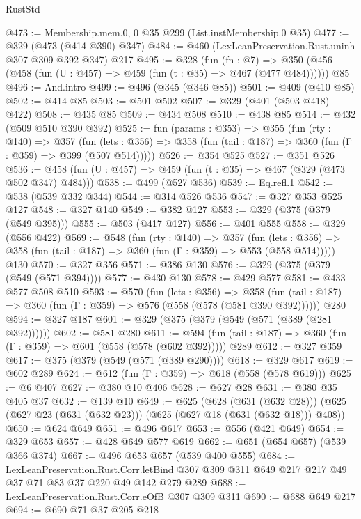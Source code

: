 \begin{lexlean}{RustStd}
\begin{coremodule}
@473 := Membership.mem.{0, 0} @35 @299 (List.instMembership.{0} @35)
@477 := @329 (@473 (@414 @390) @347)
@484 := @460 (LexLeanPreservation.Rust.uninh @307 @309 @392 @347) @217
@495 := @328
    (fun (fn : @7) =>
    @350 (@456 (@458 (fun (U : @457) => @459 (fun (t : @35) => @467 (@477 @484))))))
    @85
@496 := And.intro
@499 := @496 (@345 (@346 @85))
@501 := @409 (@410 @85)
@502 := @414 @85
@503 := @501 @502
@507 := @329 (@401 (@503 @418) @422)
@508 := @435 @85
@509 := @434 @508
@510 := @438 @85
@514 := @432 (@509 @510 @390 @392)
@525 := fun (params : @353) =>
  @355
    (fun (rty : @140) =>
    @357
      (fun (lets : @356) => @358 (fun (tail : @187) => @360 (fun (Γ : @359) => @399 (@507 @514)))))
@526 := @354 @525
@527 := @351 @526
@536 := @458 (fun (U : @457) => @459 (fun (t : @35) => @467 (@329 (@473 @502 @347) @484)))
@538 := @499 (@527 @536)
@539 := Eq.refl.{1}
@542 := @538 (@539 @332 @344)
@544 := @314 @526 @536
@547 := @327 @353 @525 @127
@548 := @327 @140
@549 := @382 @127
@553 := @329 (@375 (@379 (@549 @395)))
@555 := @503 (@417 @127)
@556 := @401 @555
@558 := @329 (@556 @422)
@569 := @548
    (fun (rty : @140) =>
    @357
      (fun (lets : @356) => @358 (fun (tail : @187) => @360 (fun (Γ : @359) => @553 (@558 @514)))))
    @130
@570 := @327 @356
@571 := @386 @130
@576 := @329 (@375 (@379 (@549 (@571 @394))))
@577 := @430 @130
@578 := @429 @577
@581 := @433 @577 @508 @510
@593 := @570
    (fun (lets : @356) =>
    @358 (fun (tail : @187) => @360 (fun (Γ : @359) => @576 (@558 (@578 (@581 @390 @392))))))
    @280
@594 := @327 @187
@601 := @329 (@375 (@379 (@549 (@571 (@389 (@281 @392))))))
@602 := @581 @280
@611 := @594 (fun (tail : @187) => @360 (fun (Γ : @359) => @601 (@558 (@578 (@602 @392))))) @289
@612 := @327 @359
@617 := @375 (@379 (@549 (@571 (@389 @290))))
@618 := @329 @617
@619 := @602 @289
@624 := @612 (fun (Γ : @359) => @618 (@558 (@578 @619)))
@625 := @6 @407
@627 := @380 @10 @406
@628 := @627 @28
@631 := @380 @35 @405 @37
@632 := @139 @10
@649 := @625
    (@628 (@631 (@632 @28)))
    (@625 (@627 @23 (@631 (@632 @23))) (@625 (@627 @18 (@631 (@632 @18))) @408))
@650 := @624 @649
@651 := @496 @617
@653 := @556 (@421 @649)
@654 := @329 @653
@657 := @428 @649 @577 @619
@662 := @651 (@654 @657) (@539 @366 @374)
@667 := @496 @653 @657 (@539 @400 @555)
@684 := LexLeanPreservation.Rust.Corr.letBind
    @307
    @309
    @311
    @649
    @217
    @217
    @49
    @37
    @71
    @83
    @37
    @220
    @49
    @142
    @279
    @289
@688 := LexLeanPreservation.Rust.Corr.eOfB @307 @309 @311
@690 := @688 @649 @217
@694 := @690 @71 @37 @205 @218

\end{coremodule}
\end{lexlean}
